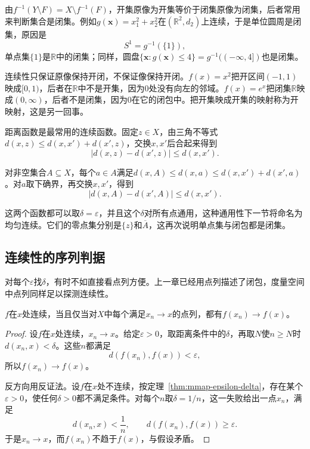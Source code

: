 由$f^{-1}(Y\setminus F)=X\setminus f^{-1}(F)$，开集原像为开集等价于闭集原像为闭集，后者常用来判断集合是闭集。例如$g(\bm x)=x_1^2+x_2^2$在$(\mathbb R^2,d_2)$上连续，于是单位圆周是闭集，原因是
\[
 S^1=g^{-1}(\{1\}),
\]
单点集$\{1\}$是$\mathbb R$中的闭集；同样，圆盘$\{\bm x:g(\bm x)\leq4\}=g^{-1}((-\infty,4])$也是闭集。

连续性只保证原像保持开闭，不保证像保持开闭。$f(x)=x^2$把开区间$(-1,1)$映成$[0,1)$，后者在$\mathbb R$中不是开集，因为$0$处没有向左的邻域。$f(x)=e^x$把闭集$\mathbb R$映成$(0,\infty)$，后者不是闭集，因为$0$在它的闭包中。把开集映成开集的映射称为开映射，这是另一回事。

距离函数是最常用的连续函数。固定$z\in X$，由三角不等式$d(x,z)\leq d(x,x')+d(x',z)$，交换$x,x'$后合起来得到
\[
 \lvert d(x,z)-d(x',z)\rvert\leq d(x,x').
\]

对非空集合$A\subseteq X$，每个$a\in A$满足$d(x,A)\leq d(x,a)\leq d(x,x')+d(x',a)$。对$a$取下确界，再交换$x,x'$，得到
\[
 \lvert d(x,A)-d(x',A)\rvert\leq d(x,x').
\]

这两个函数都可以取$\delta=\varepsilon$，并且这个$\delta$对所有点通用，这种通用性下一节将命名为均匀连续。它们的零点集分别是$\{z\}$和$\overline A$，这再次说明单点集与闭包都是闭集。

\subsection{连续性的序列判据}
\label{sec:mmap-sequential-continuity}

对每个$\varepsilon$找$\delta$，有时不如直接看点列方便。上一章已经用点列描述了闭包，度量空间中点列同样足以探测连续性。

\begin{theorem}[连续性的序列判据]
\label{thm:mmap-sequential-continuity}
$f$在$x$处连续，当且仅当对$X$中每个满足$x_n\to x$的点列，都有$f(x_n)\to f(x)$。
\end{theorem}

\begin{proof}
设$f$在$x$处连续，$x_n\to x$。给定$\varepsilon>0$，取距离条件中的$\delta$，再取$N$使$n\geq N$时$d(x_n,x)<\delta$。这些$n$都满足
\[
 d(f(x_n),f(x))<\varepsilon,
\]
所以$f(x_n)\to f(x)$。

反方向用反证法。设$f$在$x$处不连续，按定理~\ref{thm:mmap-epsilon-delta}，存在某个$\varepsilon>0$，使任何$\delta>0$都不满足条件。对每个$n$取$\delta=1/n$，这一失败给出一点$x_n$，满足
\[
 d(x_n,x)<\frac1n,\qquad d(f(x_n),f(x))\geq\varepsilon.
\]
于是$x_n\to x$，而$f(x_n)$不趋于$f(x)$，与假设矛盾。
\end{proof}


